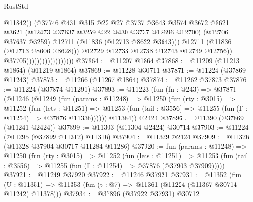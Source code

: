 \begin{lexlean}{RustStd}
\begin{coremodule}
                                                  @11842))
                                              (@37746
                                                @431
                                                @315
                                                @22
                                                @27
                                                @3737
                                                @3643
                                                @3574
                                                @3672
                                                @8621
                                                @3621
                                                (@12473 @37637 @3259 @22 @430 @3737 @12696 @12700)
                                                (@12706 @37637 @3259)
                                                @12711
                                                (@11836 (@12713 @8622 @3643)))
                                              @12711
                                              (@11836 (@12713 @8606 @8628)))
                                            @12729
                                            @12733
                                            @12738
                                            @12743
                                            @12749
                                            @12756))
                                        @37705))))))))))))))))))
@37864 := @11207 @1864
@37868 := @11209 (@11213 @1864) (@11219 @1864)
@37869 := @11228 @30711
@37871 := @11224 (@37869 @11243)
@37873 := @11266 (@11267 @1864)
@37874 := @11262 @37873
@37876 := @11224 (@37874 @11291)
@37893 := @11223
    (fun (fn : @243) =>
    @37871
      (@11246
        (@11249
          (fun (params : @11248) =>
          @11250
            (fun (rty : @3015) =>
            @11252
              (fun (lets : @11251) =>
              @11253 (fun (tail : @3556) => @11255 (fun (Γ : @11254) => @37876 @11338))))))
        @11384))
    @2424
@37896 := @11390 (@37869 (@11241 @2424))
@37899 := @11303 (@11304 @2424) @30714
@37903 := @11224 (@11295 (@37899 @11312) @11316)
@37904 := @11329 @2424
@37909 := @11326 (@11328 @37904 @30717 @11284 @11286)
@37920 := fun (params : @11248) =>
  @11250
    (fun (rty : @3015) =>
    @11252
      (fun (lets : @11251) =>
      @11253 (fun (tail : @3556) => @11255 (fun (Γ : @11254) => @37876 (@37903 @37909)))))
@37921 := @11249 @37920
@37922 := @11246 @37921
@37931 := @11352
    (fun (U : @11351) => @11353 (fun (t : @7) => @11361 (@11224 (@11367 @30714 @11242) @11378)))
@37934 := @37896 (@37922 @37931) @30712

\end{coremodule}
\end{lexlean}
